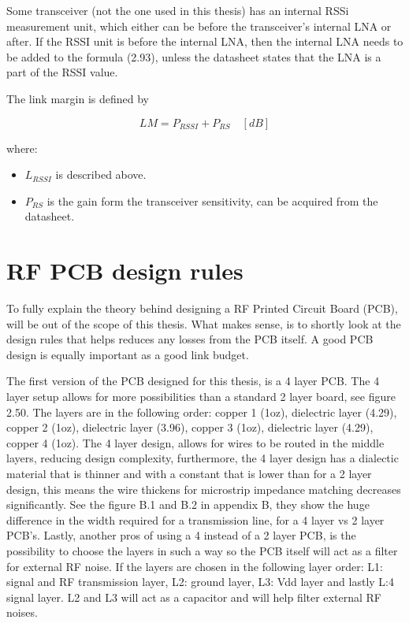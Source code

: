Some transceiver (not the one used in this thesis) has an internal RSSi measurement unit, which either can be before the transceiver's internal LNA or after. If the RSSI unit is before the internal LNA, then the internal LNA needs to be added to the formula (2.93), unless the datasheet states that the LNA is a part of the RSSI value. 

The link margin is defined by 

\begin{equation}
   LM = P_{RSSI}+P_{RS} \quad [dB]
\end{equation}

where:

\begin{itemize}
    \item $L_{RSSI}$ is described above.
    \item $P_{RS}$ is the gain form the transceiver sensitivity, can be acquired from the datasheet.
\end{itemize}

\section{RF PCB design rules}
To fully explain the theory behind designing a RF Printed Circuit Board (PCB), will be out of the scope of this thesis. What makes sense, is to shortly look at the design rules that helps reduces any losses from the PCB itself. A good PCB design is equally important as a good link budget.  

The first version of the PCB designed for this thesis, is a 4 layer PCB. The 4 layer setup allows for more possibilities than a standard 2 layer board, see figure 2.50. The layers are in the following order: copper 1 (1oz), dielectric layer (4.29), copper 2 (1oz), dielectric layer (3.96), copper 3 (1oz), dielectric layer (4.29), copper 4 (1oz). The 4 layer design, allows for wires to be routed in the middle layers, reducing design complexity, furthermore, the 4 layer design has a dialectic material that is thinner and with a constant that is lower than for a 2 layer design, this means the wire thickens for microstrip impedance matching decreases significantly. See the figure B.1 and B.2 in appendix B, they show the huge difference in the width required for a transmission line, for a 4 layer vs 2 layer PCB's. Lastly, another pros  of using a 4 instead of a 2 layer PCB, is the possibility to choose the layers in such a way so the PCB itself will act as a filter for external RF noise. If the layers are chosen in the following layer order: L1: signal and RF transmission layer, L2: ground layer, L3: Vdd layer and lastly L:4 signal layer. L2 and L3 will act as a capacitor and will help filter external RF noises. 

